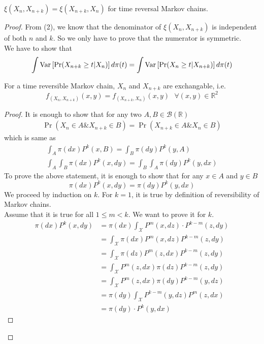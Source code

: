 \begin{theorem}
    $\xi(X_n, X_{n+k}) = \xi(X_{n+k}, X_n)$ for time reversal Markov chains.
    \begin{proof}
        From (2), we know that the denominator of $\xi(X_n, X_{n+k})$ is independent of both $n$ and $k$. So we only have to prove that the numerator is symmetric. \\
        We have to show that
        \begin{equation*}
            \int \text{Var}\left[{{\Pr (X_{n+k} \geq t | X_n)}}\right] d\pi(t) = \int \text{Var}\left[{{\Pr (X_n \geq t | X_{n+k})}}\right] d\pi(t)
        \end{equation*}
        \begin{lem}
            For a time reversible Markov chain, $X_n$ and $X_{n+k}$ are exchangable, i.e.
            \begin{equation*}
                f_{(X_{n}, X_{n+k})}(x, y) = f_{(X_{n+k}, X_{n})}(x, y) \text{  } \forall (x, y) \in \mathbb{R}^2
            \end{equation*}
            \begin{proof}
                It is enough to show that for any two $A, B \in \mathcal{B}(\mathbb{R})$
                \begin{align*}
                    \Pr(X_n \in A \& X_{n+k} \in B) = \Pr(X_{n+k} \in A \& X_{n} \in B)
                \end{align*}
                which is same as
                \begin{align*}
                    \int_A \pi(dx) P^k(x, B) = \int_B \pi(dy) P^k(y, A) \\
                    \int_A \int_B \pi(dx) P^k(x, dy) = \int_B \int_A \pi(dy) P^k(y, dx)
                \end{align*}
                To prove the above statement, it is enough to show that for any $x \in A$ and $y \in B$
                $$\pi(dx) P^k(x, dy) = \pi(dy) P^k(y, dx)$$
                We proceed by induction on $k$.
                For $k = 1$, it is true by definition of reversibility of Markov chains.\\
                Assume that it is true for all $1 \leq m < k$.
                We want to prove it for $k$.\\
                \begin{align*}
                    \pi(dx) P^k(x, dy) &= \pi(dx) \int_{\mathcal{X}} P^m(x, dz)\cdot P^{k-m}(z, dy)\\
                    &= \int_{\mathcal{X}} \pi(dx) P^m(x, dz) P^{k-m}(z, dy) \\
                    &= \int_{\mathcal{X}} \pi(dz) P^m(z, dx) P^{k-m}(z, dy) \\
                    &= \int_{\mathcal{X}} P^m(z, dx) \pi(dz) P^{k-m}(z, dy) \\
                    &= \int_{\mathcal{X}} P^m(z, dx) \pi(dy) P^{k-m}(y, dz) \\
                    &= \pi(dy) \int_{\mathcal{X}}  P^{k-m}(y, dz) P^m(z, dx) \\
                    &= \pi(dy) \cdot P^k(y, dx)
                \end{align*}


\end{proof}
\end{lem}
\end{proof}
\end{theorem}
